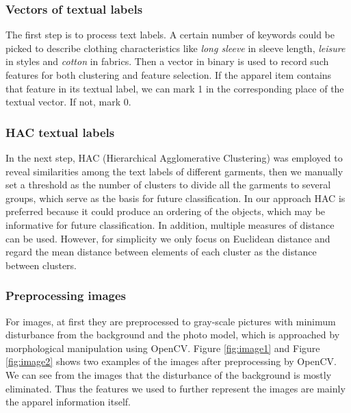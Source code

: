 \subsubsection{Vectors of textual labels}
The first step is to process text labels. A certain number of keywords could be picked to describe clothing characteristics like \emph{long sleeve} in sleeve length, \emph{leisure} in styles and \emph{cotton} in fabrics. Then a vector in binary is used to record such features for both clustering and feature selection. If the apparel item contains that feature in its textual label, we can mark 1 in the corresponding place of the textual vector. If not, mark 0.

\subsubsection{HAC textual labels}
In the next step, HAC (Hierarchical Agglomerative Clustering) was employed to reveal similarities among the text labels of different 
garments, then we manually set a threshold as the number of clusters to divide all the garments to several groups, which serve as the basis for future classification.
In our approach HAC is preferred because it could produce an ordering of the objects, which may be informative for future classification.  In addition, multiple measures of distance can be used. However, for simplicity we only focus on Euclidean distance and regard the mean distance between elements of each cluster as the distance between clusters.

\subsubsection{Preprocessing images}
For images, at first they are preprocessed to gray-scale pictures with minimum disturbance from the background and the photo model, which is approached by morphological manipulation using OpenCV. Figure \ref{fig:image1} and Figure \ref{fig:image2} shows two examples of the images after preprocessing by OpenCV. We can see from the images that the disturbance of the background is mostly eliminated. Thus the features we used to further represent the images are mainly the apparel information itself.

